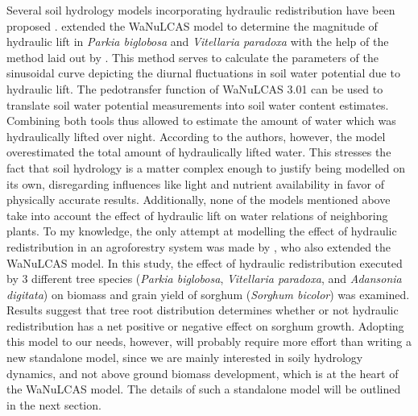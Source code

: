 Several soil hydrology models incorporating hydraulic redistribution have been proposed \parencite[e.g.,][]{gou_groundwater-soil-plant-atmosphere_2014,ryel_hydraulic_2002}.  \textcite{bayala_hydraulic_2008} extended the WaNuLCAS model \parencite{noordwijk_wanulcas_2011} to determine the magnitude of hydraulic lift in \emph{Parkia biglobosa} and \emph{Vitellaria paradoxa} with the help of the method laid out by \textcite{emerman_hydraulic_1996}.  This method serves to calculate the parameters of the sinusoidal curve depicting the diurnal fluctuations in soil water potential due to hydraulic lift.  The pedotransfer function of WaNuLCAS 3.01 \parencite{noordwijk_wanulcas_2004} can be used to translate soil water potential measurements into soil water content estimates.  Combining both tools thus allowed \textcite{bayala_hydraulic_2008} to estimate the amount of water which was hydraulically lifted over night.  According to the authors, however, the model overestimated the total amount of hydraulically lifted water.  This stresses the fact that soil hydrology is a matter complex enough to justify being modelled on its own, disregarding influences like light and nutrient availability in favor of physically accurate results.  Additionally, none of the models mentioned above take into account the effect of hydraulic lift on water relations of neighboring plants.  To my knowledge, the only attempt at modelling the effect of hydraulic redistribution in an agroforestry system was made by \textcite{coulibaly_crop_2014}, who also extended the WaNuLCAS model.  In this study, the effect of hydraulic redistribution executed by 3 different tree species (\emph{Parkia biglobosa}, \emph{Vitellaria paradoxa}, and \emph{Adansonia digitata}) on biomass and grain yield of sorghum (\emph{Sorghum bicolor}) was examined.  Results suggest that tree root distribution determines whether or not hydraulic redistribution has a net positive or negative effect on sorghum growth.  Adopting this model to our needs, however, will probably require more effort than writing a new standalone model, since we are mainly interested in soily hydrology dynamics, and not above ground biomass development, which is at the heart of the WaNuLCAS model.  The details of such a standalone model will be outlined in the next section.


